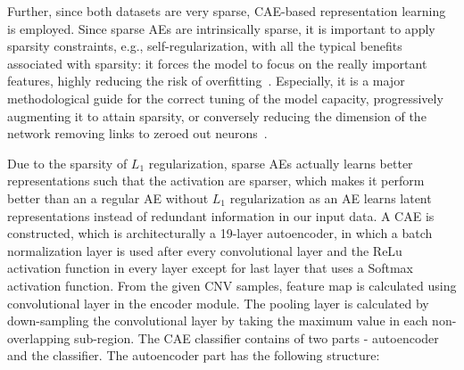 \hspace*{3.5mm} Further, since both datasets are very sparse,  CAE-based representation learning is employed. Since sparse AEs are intrinsically sparse, it is important to apply sparsity constraints, e.g., self-regularization, with all the typical benefits associated with sparsity: it forces the model to focus on the really important features, highly reducing the risk of overfitting~\cite{karimBIB2019}. Especially, it is a major methodological guide for the correct tuning of the model capacity, progressively augmenting it to attain sparsity, or conversely reducing the dimension of the network removing links to zeroed out neurons~\cite{sparseAE}. 

\hspace*{3.5mm} Due to the sparsity of $L_1$ regularization, sparse AEs actually learns better representations such that the activation are sparser, which makes it perform better than an a regular AE without $L_1$ regularization as an AE learns latent representations instead of redundant information in our input data. 
A CAE is constructed, which is architecturally a 19-layer autoencoder, in which a batch normalization layer is used after every convolutional layer and the ReLu activation function in every layer except for last layer that uses a Softmax activation function. From the given CNV samples, feature map is calculated using convolutional layer in the encoder module. The pooling layer is calculated by down-sampling the convolutional layer by taking the maximum value in each non-overlapping sub-region. The CAE classifier contains of two parts -   autoencoder and the classifier. The autoencoder part has the following structure: 

